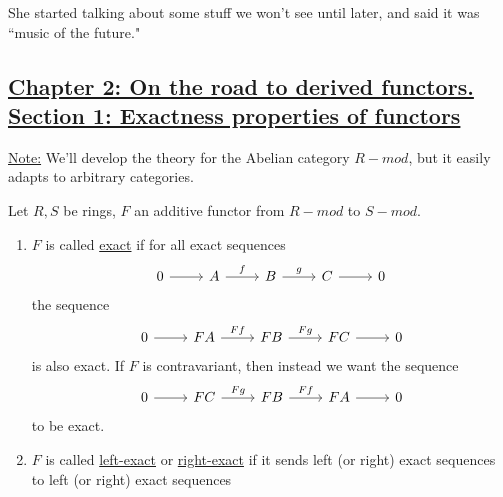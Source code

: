 \documentclass[x11names,reqno,14pt]{extarticle}
\begin{document}
She started talking about some stuff we won't see until later, and said it was ``music of the future." 

\subsection*{\underline{Chapter 2: On the road to derived functors. Section 1: Exactness properties of functors}}

\underline{Note:} We'll develop the theory for the Abelian category $R-mod$, but it easily adapts to arbitrary categories. 


Let $R, S$ be rings, $F$ an additive functor from $R-mod$ to $S-mod$. 

\begin{enumerate}

\item $F$ is called \underline{exact} if for all exact sequences
\[
\exactshort{A}{f}{B}{g}{C}
\]
the sequence
\[
\exactshort{FA}{Ff}{FB}{Fg}{FC}
\]
is also exact. If $F$ is contravariant, then instead we want the sequence
\[
\exactshort{FC}{Fg}{FB}{Ff}{FA}
\]
to be exact. 

\item $F$ is called \underline{left-exact} or \underline{right-exact} if it sends left (or right) exact sequences to left (or right) exact sequences


\end{enumerate}
\end{document}
